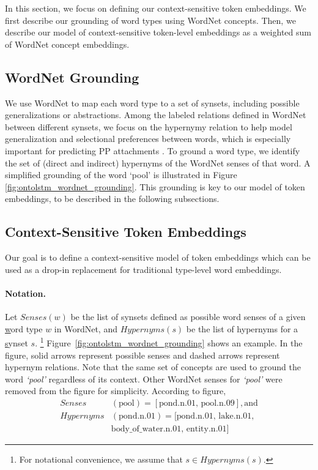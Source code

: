 In this section, we focus on defining our context-sensitive token embeddings. 
We first describe our grounding of word types using WordNet concepts.
Then, we describe our model of context-sensitive token-level embeddings as a weighted sum of WordNet concept embeddings. 

\subsection{WordNet Grounding}
We use WordNet to map each word type to a set of synsets, including possible generalizations or abstractions. 
Among the labeled relations defined in WordNet between different synsets, we focus on the hypernymy relation to help model generalization and selectional preferences between words, which is especially important for predicting PP attachments \cite{resnik:93}.
To ground a word type, we identify the set of (direct and indirect) hypernyms of the WordNet senses of that word.
A simplified grounding of the word `pool' is illustrated in Figure \ref{fig:ontolstm_wordnet_grounding}.
This grounding is key to our model of token embeddings, to be described in the following subsections. 

\subsection{Context-Sensitive Token Embeddings}
\label{sec:ontolstm_embedding_model}

Our goal is to define a context-sensitive model of token embeddings which can be used as a drop-in replacement for traditional type-level word embeddings.

\paragraph{Notation.}
Let $\textit{Senses}(w)$ be the list of synsets defined as possible word senses of a given \underline{w}ord type $w$ in WordNet, and $\textit{Hypernyms}(s)$ be the list of hypernyms for a \underline{s}ynset $s$.
\footnote{For notational convenience, we assume that $s \in \textit{Hypernyms}(s)$.} Figure~\ref{fig:ontolstm_wordnet_grounding} shows an example. In the figure, solid arrows
represent possible senses and dashed arrows represent hypernym relations. Note that the same set of concepts are used to ground the word \textit{`pool'} regardless of its context.
Other WordNet senses for \textit{`pool'} were removed from the figure for simplicity. According to figure, 
\begin{align}
\textit{Senses}&(\text{pool}) = [\text{pond.n.01, pool.n.09}], \text{and} \nonumber \\
\textit{Hypernyms}&(\text{pond.n.01}) = [\text{pond.n.01, lake.n.01}, \nonumber \\
&\text{body\_of\_water.n.01, entity.n.01}] \nonumber
\end{align}

